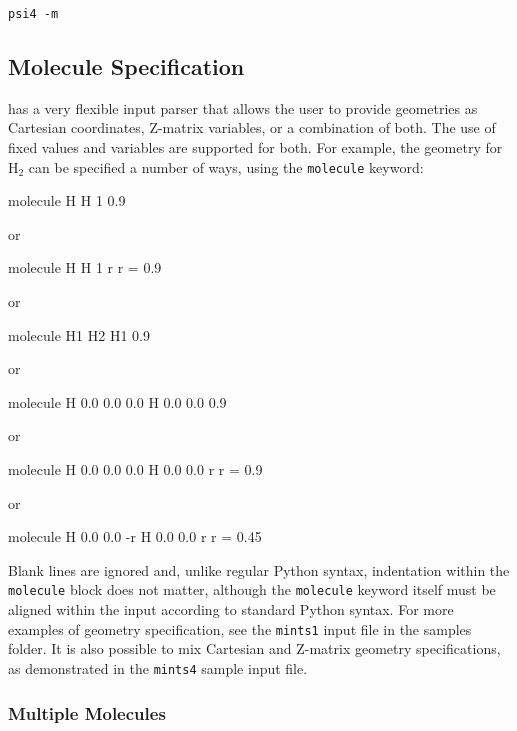 \begin{verbatim}
psi4 -m
\end{verbatim}

\subsection{Molecule Specification} \label{sec:MoleculeSpecification}
\PSIfour has a very flexible input parser that allows the user to provide
geometries as Cartesian coordinates, Z-matrix variables, or a combination of
both. The use of fixed values and variables are supported for both. For
example, the geometry for H$_2$ can be specified a number of ways, using the
{\tt molecule} keyword:
\begin{Snippet}
molecule{
  H
  H 1 0.9
}

 or

molecule{
  H
  H 1 r
  r = 0.9
}

 or

molecule{
  H1
  H2 H1 0.9
}

 or

molecule{
  H 0.0 0.0 0.0
  H 0.0 0.0 0.9
}

 or

molecule{
  H 0.0 0.0 0.0
  H 0.0 0.0 r
  r = 0.9
}

 or

molecule{
  H 0.0 0.0 -r
  H 0.0 0.0 r
  r = 0.45
}
\end{Snippet}
Blank lines are ignored and, unlike regular Python syntax, indentation within
the {\tt molecule} block does not matter, although the {\tt molecule} keyword itself must
be aligned within the input according to standard Python syntax. For more
examples of geometry specification, see the {\tt mints1} input file in the samples
folder. It is also possible to mix Cartesian and Z-matrix geometry
specifications, as demonstrated in the {\tt mints4} sample input file.

\subsubsection{Multiple Molecules}


